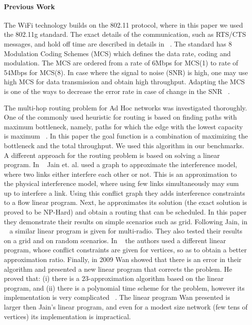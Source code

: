\documentclass[12pt]{article}
\newenvironment{proof sketch}[1]{\noindent {\emph{Proof sketch of #1:}}}{\hfill \qed}
\begin{document}
\paragraph{Previous Work}

The WiFi technology builds on the 802.11 protocol, where in this paper we used the 802.11g standard. The exact details of the communication, such as RTS/CTS messages, and hold off time are described in details in ~\cite{gast2005802}. The standard has 8 Modulation Coding Schemes (MCS) which defines the data rate, coding and modulation. The MCS are ordered from a rate of 6Mbps for MCS(1) to rate of 54Mbps for MCS(8). In case where the signal to noise (SNR) is high, one may use high MCS for data transmission and obtain high throughput. Adapting the MCS is one of the ways to decrease the error rate in case of change in the SNR ~\cite{kamerman1997wavelan,holland2001rate}.

The multi-hop routing problem for Ad Hoc networks was investigated thoroughly. One of the commonly used heuristic for routing is based on finding paths with maximum bottleneck, namely, paths for which the edge with the lowest capacity is maximum ~\cite{draves2004routing}. In this paper the goal function is a combination of maximizing the bottleneck and the total throughput. We used this algorithm in our benchmarks. A different approach for the routing problem is based on solving a linear program. In ~\cite{jain2005impact} Jain et. al. used a graph to approximate the interference model, where two links either interfere each other or not. This is an approximation to the physical interference model, where using few links simultaneously may sum up to interfere a link. Using this conflict graph they adds interference constraints to a flow linear program. Next, he approximates its solution (the exact solution is proved to be NP-Hard) and obtain a routing that can be scheduled. In this paper they demonstrate their results on simple scenarios such as grid. Following Jain, in ~\cite{alicherry2005joint11} a similar linear program is given for multi-radio. They also tested their results on a grid and on random scenarios. In ~\cite{buragohain2007improved} the authors used a different linear program, whose conflict constraints are given for vertices, so as to obtain a better approximation ratio. Finally, in 2009 Wan showed that there is an error in their algorithm and presented a new linear program that corrects the problem. He proved that: (i) there is a $23$-approximation algorithm based on the linear program, and (ii) there is a polynomial time scheme for the problem, however its implementation is very complicated ~\cite{wan2009multiflows}. The linear program Wan presented is larger then Jain's linear program, and even for a modest size network (few tens of vertices) its implementation is impractical. 
\end{document}
